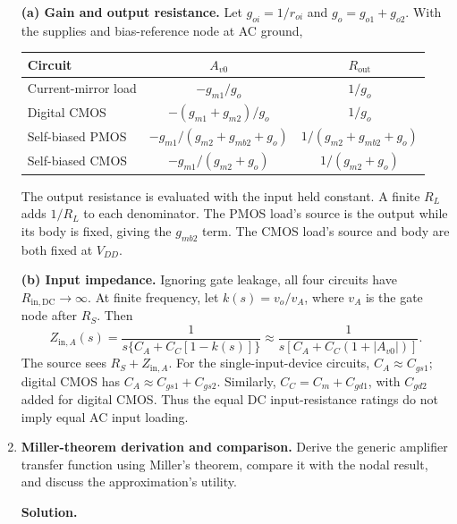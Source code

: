 \documentclass[12pt,letterpaper]{article}
\renewcommand{\arraystretch}{1.15}
\begin{document}
\begin{enumerate}
\textbf{(a) Gain and output resistance.}
Let $g_{oi}=1/r_{oi}$ and $g_o=g_{o1}+g_{o2}$.
With the supplies and bias-reference node at AC ground,
\begin{center}
\small
\setlength{\tabcolsep}{7pt}
\renewcommand{\arraystretch}{1.25}
\begin{tabular}{@{}lcc@{}}
\toprule
Circuit & $A_{v0}$ & $R_{\mathrm{out}}$\\
\midrule
Current-mirror load & $-g_{m1}/g_o$ & $1/g_o$\\
Digital CMOS & $-(g_{m1}+g_{m2})/g_o$ & $1/g_o$\\
Self-biased PMOS & $-g_{m1}/(g_{m2}+g_{mb2}+g_o)$
 & $1/(g_{m2}+g_{mb2}+g_o)$\\
Self-biased CMOS & $-g_{m1}/(g_{m2}+g_o)$ & $1/(g_{m2}+g_o)$\\
\bottomrule
\end{tabular}
\end{center}
The output resistance is evaluated with the input held constant. A finite
$R_L$ adds $1/R_L$ to each denominator. The PMOS load's source
is the output while its body is fixed, giving the $g_{mb2}$ term.
The CMOS load's source and body are both fixed at $V_{DD}$.

\textbf{(b) Input impedance.}
Ignoring gate leakage, all four circuits have
$R_{\mathrm{in,DC}}\rightarrow\infty$.
At finite frequency, let $k(s)=v_o/v_A$, where $v_A$ is the gate node
after $R_S$. Then
\[
Z_{\mathrm{in},A}(s)=
\frac{1}{s\{C_A+C_C[1-k(s)]\}}
\approx\frac{1}{s[C_A+C_C(1+|A_{v0}|)]}.
\]
The source sees $R_S+Z_{\mathrm{in},A}$.
For the single-input-device circuits, $C_A\approx C_{gs1}$; digital CMOS has
$C_A\approx C_{gs1}+C_{gs2}$.
Similarly, $C_C=C_m+C_{gd1}$, with $C_{gd2}$ added for digital CMOS.
Thus the equal DC input-resistance ratings do not imply equal AC
input loading.

\newpage
\item \textbf{Miller-theorem derivation and comparison.}
Derive the generic amplifier transfer function using Miller's theorem,
compare it with the nodal result, and discuss the approximation's utility.

\textbf{Solution.}


\end{enumerate}
\end{document}
